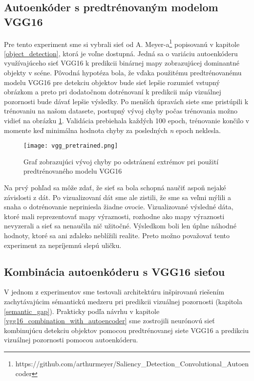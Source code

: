\subsection{Autoenkóder s predtrénovaným modelom VGG16}
\label{experiments_vgg_net}

Pre tento experiment sme si vybrali sieť od A. Meyer-a\footnote{https://github.com/arthurmeyer/Saliency\_Detection\_Convolutional\_Autoencoder} popisovanú v kapitole \ref{object_detection}, ktorá je voľne dostupná. Jedná sa o variáciu autoenkóderu využívajúceho sieť VGG16 k predikcii binárnej mapy zobrazujúcej dominantné objekty v scéne. Pôvodná hypotéza bola, že vďaka použitému predtrénovanému modelu VGG16 pre detekciu objektov bude sieť lepšie rozumieť vstupný obrázkom a preto pri dodatočnom dotrénovaní k predikcii máp vizuálnej pozornosti bude dávať lepšie výsledky. Po menších úpravách siete sme pristúpili k trénovaniu na našom datasete, postupný vývoj chyby počas trénovania možno vidieť na obrázku \ref{vgg_pretrained_loss}. Validácia prebiehala každých 100 epoch, trénovanie končilo v momente keď minimálna hodnota chyby za posledných \textit{n} epoch neklesla. 
 
\begin{figure}[H]
	\begin{center}
		\texttt{[image: vgg\_pretrained.png]}
		\caption[Vývoj chyby počas trénovanie siete s predtrénovaným modelom VGG16]{
			Graf zobrazujúci vývoj chyby po odstránení extrémov pri použití predtrénovaného modelu VGG16 
		}\label{vgg_pretrained_loss}
	\end{center}
\end{figure}

Na prvý pohľad sa môže zdať, že sieť sa bola schopná naučiť aspoň nejaké závislosti z dát. Po vizualizovaní dát sme ale zistili, že sme sa veľmi mýlili a snaha o dotrénovanie nepriniesla žiadne ovocie. Vizualizované výsledné dáta, ktoré mali reprezentovať mapy výraznosti, rozhodne ako mapy výraznosti nevyzerali a sieť sa nenaučila nič užitočné. Výsledkom boli len úplne náhodné hodnoty, ktoré sa ani zďaleko neblížili realite. Preto možno považovať tento experiment za nepríjemnú slepú uličku.

\subsection{Kombinácia autoenkóderu s VGG16 sieťou}

V jednom z experimentov sme testovali architektúru inšpirovanú riešením  zachytávajúcim sémantickú medzeru pri predikcii vizuálnej pozornosti (kapitola \ref{semantic_gap}). Prakticky podľa návrhu v kapitole \ref{vgg16_combination_with_autoencoder} sme zostrojili neurónovú sieť kombinujúcu detekciu objektov pomocou predtrénovanej siete VGG16 a predikciu vizuálnej pozornosti pomocou autoenkóderu. 

